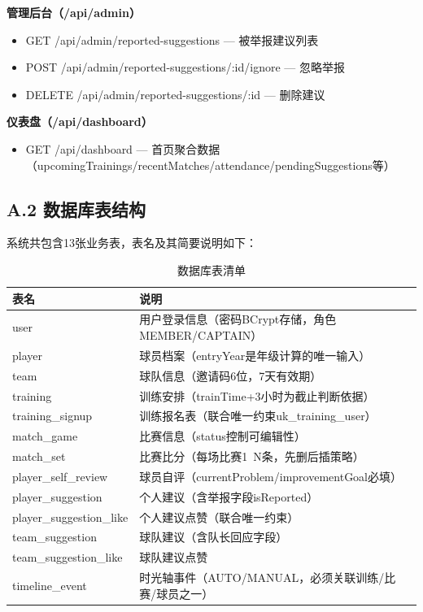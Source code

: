 \documentclass[12pt,a4paper]{ctexart}
\begin{document}
\textbf{管理后台（/api/admin）}
\begin{itemize}[leftmargin=2em]
\item GET /api/admin/reported-suggestions — 被举报建议列表
\item POST /api/admin/reported-suggestions/:id/ignore — 忽略举报
\item DELETE /api/admin/reported-suggestions/:id — 删除建议
\end{itemize}

\textbf{仪表盘（/api/dashboard）}
\begin{itemize}[leftmargin=2em]
\item GET /api/dashboard — 首页聚合数据（upcomingTrainings/recentMatches/attendance/pendingSuggestions等）
\end{itemize}

\subsection*{A.2 \quad 数据库表结构}

系统共包含13张业务表，表名及其简要说明如下：

\begin{table}[H]
\centering
\caption{数据库表清单}
\begin{tabular}{p{4.5cm}p{9cm}}
\toprule
\textbf{表名} & \textbf{说明} \\
\midrule
user & 用户登录信息（密码BCrypt存储，角色MEMBER/CAPTAIN） \\
player & 球员档案（entryYear是年级计算的唯一输入） \\
team & 球队信息（邀请码6位，7天有效期） \\
training & 训练安排（trainTime+3小时为截止判断依据） \\
training\_signup & 训练报名表（联合唯一约束uk\_training\_user） \\
match\_game & 比赛信息（status控制可编辑性） \\
match\_set & 比赛比分（每场比赛1~N条，先删后插策略） \\
player\_self\_review & 球员自评（currentProblem/improvementGoal必填） \\
player\_suggestion & 个人建议（含举报字段isReported） \\
player\_suggestion\_like & 个人建议点赞（联合唯一约束） \\
team\_suggestion & 球队建议（含队长回应字段） \\
team\_suggestion\_like & 球队建议点赞 \\
timeline\_event & 时光轴事件（AUTO/MANUAL，必须关联训练/比赛/球员之一） \\
\bottomrule
\end{tabular}
\end{table}
\end{document}
